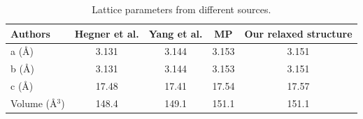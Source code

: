 \begin{table}
\caption{Lattice parameters from different sources.}
\label{tab:lattice_parameters}
\begin{tabular}{l|cccc}
\toprule
Authors & Hegner et al. \cite{hegnerCriticalRoleAnharmonic2024} & Yang et al. \cite{yangStrongOpticalAbsorption2013} & MP \cite{noneavailableMaterialsDataTaCuN22017} & Our relaxed structure \\
\midrule
a (\unit{\angstrom}) & 3.131 & 3.144 & 3.153 & 3.151 \\
b (\unit{\angstrom}) & 3.131 & 3.144 & 3.153 & 3.151 \\
c (\unit{\angstrom}) & 17.48 & 17.41 & 17.54 & 17.57 \\
Volume ($\unit{\angstrom^3}$) & 148.4 & 149.1 & 151.1 & 151.1 \\
\bottomrule
\end{tabular}
\end{table}
